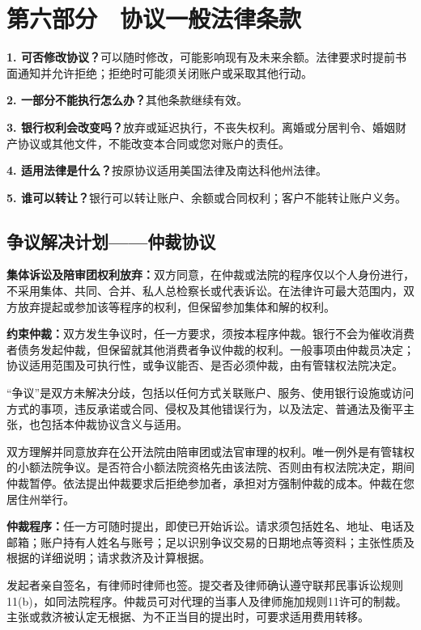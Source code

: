 \documentclass[UTF8,fontset=none,11pt,a4paper]{ctexart}
\begin{document}
\section*{第六部分　协议一般法律条款}
\textbf{1. 可否修改协议？}可以随时修改，可能影响现有及未来余额。法律要求时提前书面通知并允许拒绝；拒绝时可能须关闭账户或采取\allowbreak\mbox{其他行动。}


\textbf{2. 一部分不能执行怎么办？}其他条款\allowbreak\mbox{继续有效。}


\textbf{3. 银行权利会改变吗？}放弃或延迟执行，不丧失权利。离婚或分居判令、婚姻财产协议或其他文件，不能改变本合同或您对账\allowbreak\mbox{户的责任。}


\textbf{4. 适用法律是什么？}按原协议适用美国法律及南达科\allowbreak\mbox{他州法律。}


\textbf{5. 谁可以转让？}银行可以转让账户、余额或合同权利；客户不能转让\allowbreak\mbox{账户义务。}


\subsection*{争议解决计划——仲裁协议}
\textbf{集体诉讼及陪审团权利放弃：}双方同意，在仲裁或法院的程序仅以个人身份进行，不采用集体、共同、合并、私人总检察长或代表诉讼。在法律许可最大范围内，双方放弃提起或参加该等程序的权利，但保留参加集体和\allowbreak\mbox{解的权利。}


\textbf{约束仲裁：}双方发生争议时，任一方要求，须按本程序仲裁。银行不会为催收消费者债务发起仲裁，但保留就其他消费者争议仲裁的权利。一般事项由仲裁员决定；协议适用范围及可执行性，或争议能否、是否必须仲裁，由有管辖权\allowbreak\mbox{法院决定。}


“争议”是双方未解决分歧，包括以任何方式关联账户、服务、使用银行设施或访问方式的事项，违反承诺或合同、侵权及其他错误行为，以及法定、普通法及衡平主张，也包括本仲裁协议含\allowbreak\mbox{义与适用。}


双方理解并同意放弃在公开法院由陪审团或法官审理的权利。唯一例外是有管辖权的小额法院争议。是否符合小额法院资格先由该法院、否则由有权法院决定，期间仲裁暂停。依法提出仲裁要求后拒绝参加者，承担对方强制仲裁的成本。仲裁在您居\allowbreak\mbox{住州举行。}


\textbf{仲裁程序：}任一方可随时提出，即使已开始诉讼。请求须包括姓名、地址、电话及邮箱；账户持有人姓名与账号；足以识别争议交易的日期地点等资料；主张性质及根据的详细说明；请求救济及\allowbreak\mbox{计算根据。}


发起者亲自签名，有律师时律师也签。提交者及律师确认遵守联邦民事诉讼规则11(b)，如同法院程序。仲裁员可对代理的当事人及律师施加规则11许可的制裁。主张或救济被认定无根据、为不正当目的提出时，可要求适用\allowbreak\mbox{费用转移。}
\end{document}
